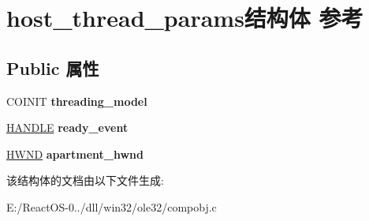\hypertarget{structhost__thread__params}{}\section{host\+\_\+thread\+\_\+params结构体 参考}
\label{structhost__thread__params}
\subsection*{Public 属性}
\begin{DoxyCompactItemize}
\item 
\mbox{\label{structhost__thread__params_aad2b3f119066b1c5b91ee315c227772d}} 
C\+O\+I\+N\+IT {\bfseries threading\+\_\+model}
\item 
\mbox{\label{structhost__thread__params_ab71725012f2b9ff334b8a4606c10221c}} 
\hyperlink{interfacevoid}{H\+A\+N\+D\+LE} {\bfseries ready\+\_\+event}
\item 
\mbox{\label{structhost__thread__params_af95e48acc4b69087dfa2822564ab7719}} 
\hyperlink{interfacevoid}{H\+W\+ND} {\bfseries apartment\+\_\+hwnd}
\end{DoxyCompactItemize}


该结构体的文档由以下文件生成\+:\begin{DoxyCompactItemize}
\item 
E\+:/\+React\+O\+S-\/0../dll/win32/ole32/compobj.\+c\end{DoxyCompactItemize}
